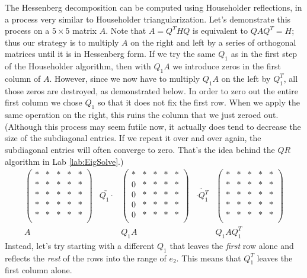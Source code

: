 The Hessenberg decomposition can be computed using Householder reflections, in a process very similar to Householder triangularization.
Let's demonstrate this process on a $5 \times 5$ matrix $A$.
Note that $A=Q^THQ$ is equivalent to $QAQ^T = H$; thus our strategy is to multiply $A$ on the right and left by a series of orthogonal matrices until it is in Hessenberg form.
If we try the same $Q_1$ as in the first step of the Householder algorithm, then with $Q_1 A$ we introduce zeros in the first column of $A$.
However, since we now have to multiply $Q_1 A$ on the left by $Q_1^T$, all those zeros are destroyed, as demonstrated below.
In order to zero out the entire first column we chose $Q_1$ so that it does not fix the first row.
When we apply the same operation on the right, this ruins the column that we just zeroed out.
(Although this process may seem futile now, it actually does tend to decrease the size of the subdiagonal entries.
If we repeat it over and over again, the subdiagonal entries will often converge to zero.
That's the idea behind the $QR$ algorithm in Lab \ref{lab:EigSolve}.)
\[
\begin{array}{ccccc} 
\begin{pmatrix}
* & * & * & * & *\\
* & * & * & * & *\\
* & * & * & * & *\\
* & * & * & * & *\\
* & * & * & * & *\\
\end{pmatrix} 
&\underrightarrow{Q_1 \cdot }&
\begin{pmatrix}
* & * & * & * & *\\
0 & * & * & * & *\\
0 & * & * & * & *\\
0 & * & * & * & *\\
0 & * & * & * & *\\
\end{pmatrix} 
&\underrightarrow{\cdot Q_1^T }&
\begin{pmatrix}
* & * & * & * & *\\
* & * & * & * & *\\
* & * & * & * & *\\
* & * & * & * & *\\
* & * & * & * & *\\
\end{pmatrix} 
\\ 
A & & Q_1A & & Q_1 A Q_1^T
  \end{array}
\]
Instead, let's try starting with a different $Q_1$ that leaves the \emph{first} row alone and reflects the \emph{rest} of the rows into the range of $e_2$. This means that $Q_1^T$ leaves the first column alone.
